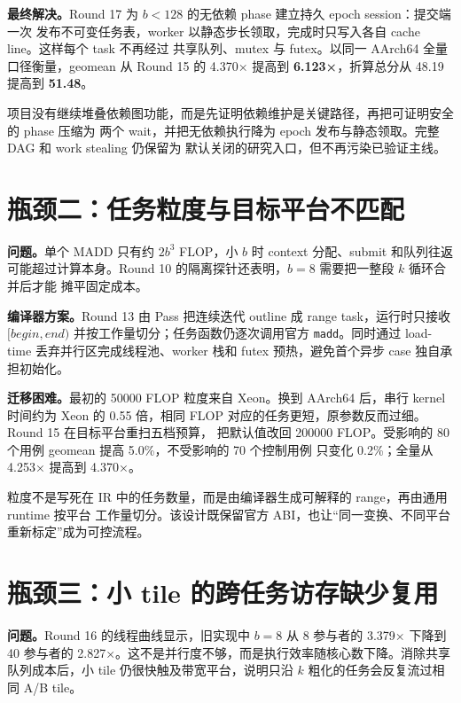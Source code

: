 \documentclass[UTF8,a4paper,openany,11pt,fontset=fandol]{ctexrep}
\begin{document}
\textbf{最终解决。}Round 17 为 \(b<128\) 的无依赖 phase 建立持久 epoch session：提交端一次
发布不可变任务表，worker 以静态步长领取，完成时只写入各自 cache line。这样每个 task 不再经过
共享队列、mutex 与 futex。以同一 AArch64 全量口径衡量，geomean 从 Round 15 的 4.370× 提高到
\textbf{6.123×}，折算总分从 48.19 提高到 \textbf{51.48}。

\begin{summarybox}[title=亮点一：让任务表示的成本匹配任务本身]
项目没有继续堆叠依赖图功能，而是先证明依赖维护是关键路径，再把可证明安全的 phase 压缩为
两个 wait，并把无依赖执行降为 epoch 发布与静态领取。完整 DAG 和 work stealing 仍保留为
默认关闭的研究入口，但不再污染已验证主线。
\end{summarybox}

\section{瓶颈二：任务粒度与目标平台不匹配}

\textbf{问题。}单个 MADD 只有约 \(2b^3\) FLOP，小 \(b\) 时 context 分配、submit 和队列往返
可能超过计算本身。Round 10 的隔离探针还表明，\(b=8\) 需要把一整段 \(k\) 循环合并后才能
摊平固定成本。

\textbf{编译器方案。}Round 13 由 Pass 把连续迭代 outline 成 range task，运行时只接收
\([begin,end)\) 并按工作量切分；任务函数仍逐次调用官方 \texttt{madd}。同时通过 load-time
丢弃并行区完成线程池、worker 栈和 futex 预热，避免首个异步 case 独自承担初始化。

\textbf{迁移困难。}最初的 50000 FLOP 粒度来自 Xeon。换到 AArch64 后，串行 kernel 时间约为
Xeon 的 0.55 倍，相同 FLOP 对应的任务更短，原参数反而过细。Round 15 在目标平台重扫五档预算，
把默认值改回 200000 FLOP。受影响的 80 个用例 geomean 提高 5.0\%，不受影响的 70 个控制用例
只变化 0.2\%；全量从 4.253× 提高到 4.370×。

\begin{summarybox}[title=亮点二：Pass 传递语义区间，runtime 决定粒度]
粒度不是写死在 IR 中的任务数量，而是由编译器生成可解释的 range，再由通用 runtime 按平台
工作量切分。该设计既保留官方 ABI，也让“同一变换、不同平台重新标定”成为可控流程。
\end{summarybox}

\section{瓶颈三：小 tile 的跨任务访存缺少复用}

\textbf{问题。}Round 16 的线程曲线显示，旧实现中 \(b=8\) 从 8 参与者的 3.379× 下降到 40
参与者的 2.827×。这不是并行度不够，而是执行效率随核心数下降。消除共享队列成本后，小 tile
仍很快触及带宽平台，说明只沿 \(k\) 粗化的任务会反复流过相同 A/B tile。
\end{document}
